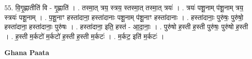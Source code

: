 \documentclass[17pt]{extarticle}
\begin{document}
55. वि॒गृ॒ह्णातीति॑ वि - गृ॒ह्णाति॑ । . तस्मा॒त् त्रय॒ स्त्रय॒ स्तस्मा॒त् तस्मा॒त् त्रयः॑ । . त्रयः॑ पशू॒नाम् प॑शू॒नाम् त्रय॒ स्त्रयः॑ पशू॒नाम् । . प॒शू॒नाꣳ हस्ता॑दाना॒ हस्ता॑दानाः पशू॒नाम् प॑शू॒नाꣳ हस्ता॑दानाः । . हस्ता॑दानाः॒ पुरु॑षः॒ पुरु॑षो॒ हस्ता॑दाना॒ हस्ता॑दानाः॒ पुरु॑षः । . हस्ता॑दाना॒ इति॒ हस्त॑ - आ॒दा॒नाः॒ । . पुरु॑षो ह॒स्ती ह॒स्ती पुरु॑षः॒ पुरु॑षो ह॒स्ती । . ह॒स्ती म॒र्कटो॑ म॒र्कटो॑ ह॒स्ती ह॒स्ती म॒र्कटः॑ । . म॒र्कट॒ इति॑ म॒र्कटः॑ । \newline

\textbf{Ghana Paata } \newline
\end{document}
